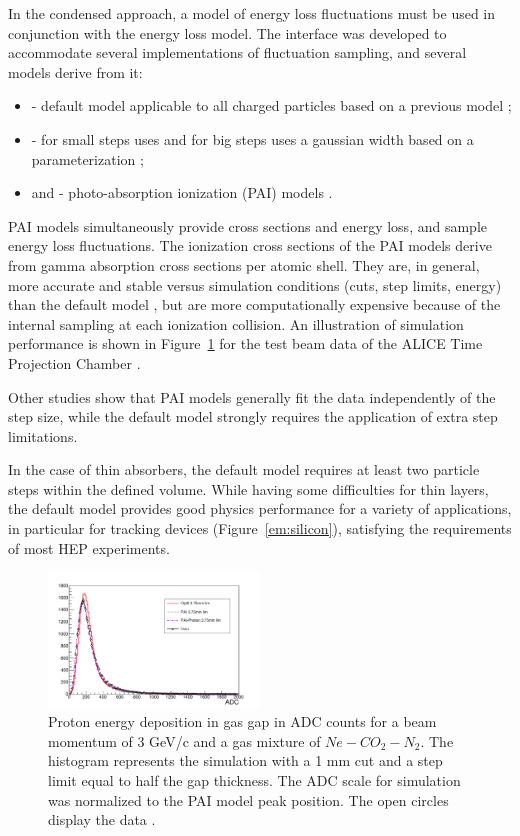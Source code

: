 In the condensed approach, a model of energy loss fluctuations must be used in
conjunction with the energy loss model.  The  
interface was developed to accommodate several implementations of fluctuation
sampling, and several models derive from it:
\begin{itemize}
\item {} - default model applicable to all charged 
particles based on a previous model \cite{embib:fluc};
\item {} -  for small steps uses
 and for big steps uses a gaussian width based
on a parameterization \cite{embib:ionfluc};
\item {} and  - photo-absorption 
ionization (PAI) models \cite{embib:pai}.
\end{itemize}
PAI models simultaneously provide cross sections and energy loss, and sample
energy loss fluctuations.  The ionization cross sections of the PAI models
derive from gamma absorption cross sections per atomic shell.  They are, in 
general, more accurate and stable versus simulation conditions (cuts, step 
limits, energy) than the default model \cite{embib:chep14,embib:chep11}, but are
more computationally expensive because of the internal sampling at each
ionization collision.  An illustration of simulation performance is shown in 
Figure~\ref{em:alice} for the test beam data of the ALICE Time Projection 
Chamber \cite{embib:tpc1,embib:tpc2}. 

Other studies show that PAI models generally fit the data 
independently of the step size, while the default model strongly requires the
application of extra step limitations. 

In the case of thin absorbers, the default model requires at least two particle
steps within the defined volume.  While having some difficulties for thin 
layers, the default model provides good physics performance for a variety of 
applications, in particular for tracking devices (Figure~\ref{em:silicon}), 
satisfying the requirements of most HEP experiments.

\begin{figure}
\includegraphics[width=0.5\textwidth]{figures/A_p_3gev_1mm.pdf}
\caption{Proton energy deposition in gas gap in ADC counts for a beam momentum 
         of 3 GeV/c and a gas mixture of $Ne-CO_2-N_2$.  
         The histogram represents the simulation with a 1 mm cut and a step limit
         equal to half the gap thickness.  The ADC scale for simulation was 
         normalized to the PAI model peak position.  The open circles display
         the data \cite{embib:tpc1,embib:tpc2}.}
\label{em:alice}
\end{figure}

